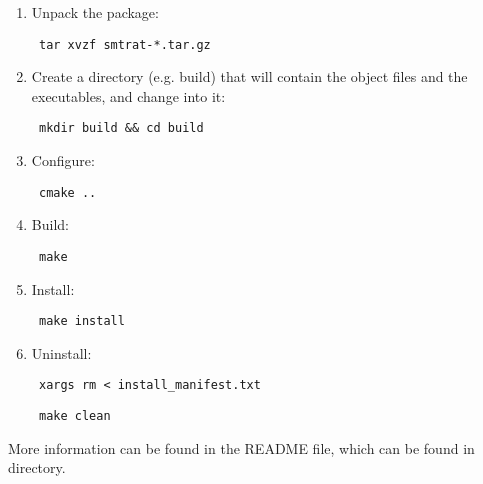 \begin{enumerate}
	\item Unpack the package:
		\begin{verbatim} tar xvzf smtrat-*.tar.gz \end{verbatim}
	\item Create a directory (e.g. build) that will contain the object files and the executables, and change into it:
		\begin{verbatim} mkdir build && cd build\end{verbatim}
	\item Configure:
		\begin{verbatim} cmake .. \end{verbatim}
	\item Build: 
		\begin{verbatim} make \end{verbatim}
	\item Install: 
		\begin{verbatim} make install \end{verbatim}
	\item Uninstall: 
		\begin{verbatim} xargs rm < install_manifest.txt \end{verbatim}
		\begin{verbatim} make clean \end{verbatim}
\end{enumerate}

More information can be found in the README file, which can be found in \smtrat directory.

